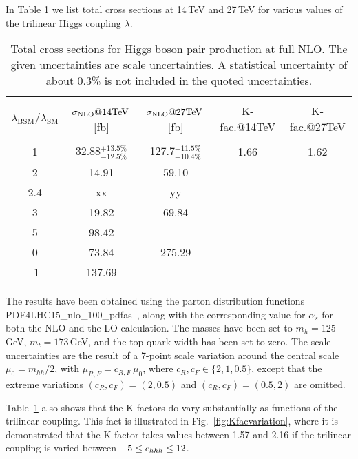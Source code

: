 In Table \ref{tab:sigmatot} we list total cross sections at 14\,TeV and 27\,TeV for various values of the trilinear Higgs coupling $\lambda$. 
\begin{table}[htb]
\begin{center}
\begin{tabular}{| c | c | c |c|c|}
\hline
&&&&\\
$\lambda_{\mathrm{BSM}}/\lambda_{\mathrm{SM}}$ & $\sigma_{\rm{NLO}}@14 \mathrm{TeV}$\,[fb] & $\sigma_{\rm{NLO}}@27 \mathrm{TeV}$\,[fb] &K-fac.@14TeV&K-fac.@27TeV\\
&&&&\\
\hline
1& 32.88$^{+13.5\%}_{-12.5\%}$&127.7$^{+11.5\%}_{-10.4\%}$ &1.66&1.62\\
\hline
2 & 14.91 &  59.10&&\\
\hline
2.4 & xx& yy&&\\
\hline
3& 19.82 & 69.84&&\\
\hline 
5 & 98.42& &&\\
\hline 
0 & 73.84& 275.29&&\\
\hline 
-1 & 137.69& &&\\
\hline
\end{tabular}
\end{center}
\caption{Total cross sections for Higgs boson pair production at full NLO. The given uncertainties are scale uncertainties. 
A statistical uncertainty of about 0.3\% is not included in the quoted uncertainties.\label{tab:sigmatot}}
\end{table}
The results have been obtained using the parton distribution functions PDF4LHC15\_nlo\_100\_pdfas~\cite{Butterworth:2015oua,CT14,MMHT14,NNPDF},
along with the corresponding value for $\alpha_s$ for both the NLO and
the LO calculation.
The masses have been set to $m_h=125$\,GeV, $m_t=173$\,GeV,
and the top quark width has been set to zero. 
The scale uncertainties are the result of a 7-point scale variation around the central scale $\mu_0 = m_{hh}/2$,
with $\mu_{R,F}=c_{R,F}\,\mu_0$, where 
$c_R,c_F\in \{2,1,0.5\}$, except that the extreme variations $(c_R,c_F)=(2,0.5)$ and $(c_R,c_F)=(0.5,2)$
are omitted. 

Table~\ref{tab:sigmatot} also shows that the K-factors do vary substantially as functions of the trilinear coupling.
This fact is illustrated in Fig.~\ref{fig:Kfacvariation}, where it is demonstrated that the K-factor takes values between 1.57 and 2.16
if the trilinear coupling is varied between $-5\leq c_{hhh}\leq 12$.

